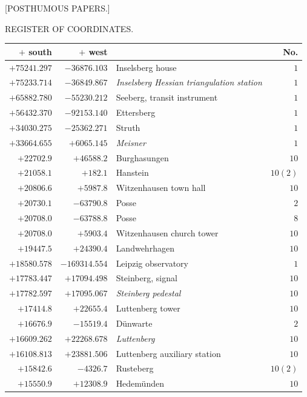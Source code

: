 \clearpage{}%
\begin{center}[POSTHUMOUS PAPERS.]\par\bigskip REGISTER OF COORDINATES.\end{center}
\begin{center}\begingroup\fontsize{8}{9}\selectfont
\setlength{\tabcolsep}{4pt}
\begin{tabular}{r|r|p{170pt}|r}\hline
\(+\) south&\(+\) west&&No.\\\hline
\(+75241.297\)&\(-36876.103\)&Inselsberg house&\(1\)\\
\(+75233.714\)&\(-36849.867\)&\textit{Inselsberg Hessian triangulation station}&\(1\)\\
\(+65882.780\)&\(-55230.212\)&Seeberg, transit instrument&\(1\)\\
\(+56432.370\)&\(-92153.140\)&Ettersberg&\(1\)\\
\(+34030.275\)&\(-25362.271\)&Struth&\(1\)\\
\(+33664.655\)&\(+6065.145\)&\textit{Meisner}&\(1\)\\
\(+22702.9\)&\(+46588.2\)&Burghasungen&\(10\)\\
\(+21058.1\)&\(+182.1\)&Hanstein&\(10(2)\)\\
\(+20806.6\)&\(+5987.8\)&Witzenhausen town hall&\(10\)\\
\(+20730.1\)&\(-63790.8\)&Posse&\(2\)\\
\(+20708.0\)&\(-63788.8\)&Posse&\(8\)\\
\(+20708.0\)&\(+5903.4\)&Witzenhausen church tower&\(10\)\\
\(+19447.5\)&\(+24390.4\)&Landwehrhagen&\(10\)\\
\(+18580.578\)&\(-169314.554\)&Leipzig observatory&\(1\)\\
\(+17783.447\)&\(+17094.498\)&Steinberg, signal&\(10\)\\
\(+17782.597\)&\(+17095.067\)&\textit{Steinberg pedestal}&\(10\)\\
\(+17414.8\)&\(+22655.4\)&Luttenberg tower&\(10\)\\
\(+16676.9\)&\(-15519.4\)&Dünwarte&\(2\)\\
\(+16609.262\)&\(+22268.678\)&\textit{Luttenberg}&\(10\)\\
\(+16108.813\)&\(+23881.506\)&Luttenberg auxiliary station&\(10\)\\
\(+15842.6\)&\(-4326.7\)&Rusteberg&\(10(2)\)\\
\(+15550.9\)&\(+12308.9\)&Hedemünden&\(10\)\\

\end{tabular}
\end{center}
